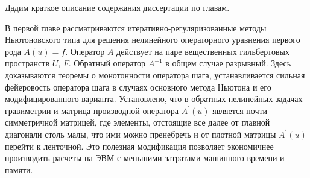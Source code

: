 \documentclass[14pt]{article}
\begin{document}
Дадим краткое описание содержания диссертации по главам.

В первой главе рассматриваются итеративно-регуляризованные методы Ньютоновского типа для решения нелинейного операторного уравнения первого рода \begin{math}A(u)=f \end{math}. Оператор $A$ действует на паре вещественных гильбертовых пространств $U$, $F$. Обратный оператор $A^{-1}$ в общем случае разрывный. Здесь доказываются теоремы о монотонности оператора шага, устанавливается сильная фейеровость оператора шага в случаях основного метода Ньютона и его модифицированного варианта. Установлено, что в обратных нелинейных задачах гравиметрии и матрица производной оператора $A^{'}(u)$ является почти симметричной матрицей, где элементы, отстоящие все далее от главной диагонали столь малы, что ими можно пренебречь и от плотной матрицы $A^{'}(u)$ перейти к ленточной. Это полезная модификация позволяет экономичнее производить расчеты на ЭВМ с меньшими затратами машинного времени и памяти.
\end{document}
